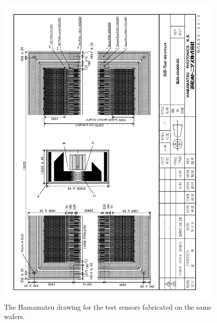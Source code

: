 \documentclass[prc,12pt,nofootinbib,letterpaper]{revtex4}
\begin{document}
\begin{figure}[p]
\begin{center}
    \includegraphics[width=6in]{figures/test structure}
\caption{The Hamamatsu drawing for the test sensors fabricated on the same wafers.}
\label{fig:drawing-testsensor}
\end{center}
\end{figure}
\end{document}
